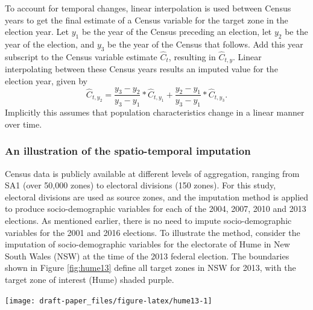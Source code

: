 \documentclass[11pt,a4paper,]{article}
\let\origfigure\figure
\let\endorigfigure\endfigure
\renewenvironment{figure}[1][2] {
    \expandafter\origfigure\expandafter[htbp]
} {
    \endorigfigure
}
\begin{document}
\enlargethispage*{0.5cm}

To account for temporal changes, linear interpolation is used between Census years to get the final estimate of a Census variable for the target zone in the election year. Let \(y_1\) be the year of the Census preceding an election, let \(y_2\) be the year of the election, and \(y_3\) be the year of the Census that follows. Add this year subscript to the Census variable estimate \(\hat{C}_t\), resulting in \(\hat{C}_{t,y}\). Linear interpolating between these Census years results an imputed value for the election year, given by
\[
  \hat{C}_{t,y_2} = \frac{y_3-y_2}{y_3-y_1} * \hat{C}_{t,y_1} +
    \frac{y_2-y_1}{y_3-y_1} * \hat{C}_{t,y_3}.
\]
Implicitly this assumes that population characteristics change in a linear manner over time.

\hypertarget{an-illustration-of-the-spatio-temporal-imputation}{%
\subsubsection*{An illustration of the spatio-temporal imputation}\label{an-illustration-of-the-spatio-temporal-imputation}}

Census data is publicly available at different levels of aggregation, ranging from SA1 (over 50,000 zones) to electoral divisions (150 zones). For this study, electoral divisions are used as source zones, and the imputation method is applied to produce socio-demographic variables for each of the 2004, 2007, 2010 and 2013 elections. As mentioned earlier, there is no need to impute socio-demographic variables for the 2001 and 2016 elections. To illustrate the method, consider the imputation of socio-demographic variables for the electorate of Hume in New South Wales (NSW) at the time of the 2013 federal election. The boundaries shown in Figure \ref{fig:hume13} define all target zones in NSW for 2013, with the target zone of interest (Hume) shaded purple.

\begin{figure}[h]

{\centering \texttt{[image: draft-paper\_files/figure-latex/hume13-1]} 

}

\caption{Some of the electoral boundaries in NSW for 2013, with the electoral boundary for Hume shown in purple.}\label{fig:hume13}
\end{figure}
\end{document}
